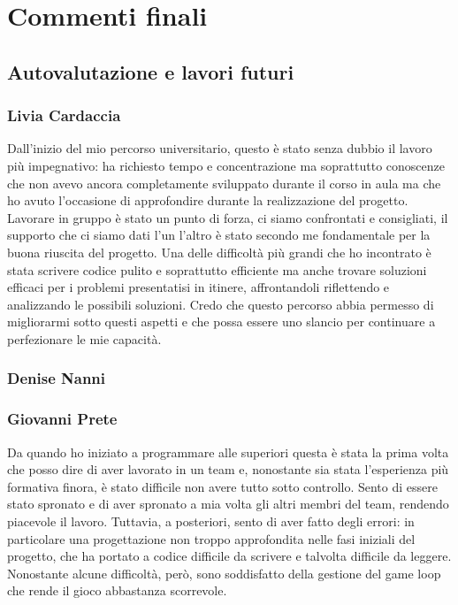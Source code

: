 \documentclass{article}
\begin{document}
\section{Commenti finali}
\subsection{Autovalutazione e lavori futuri}
\subsubsection{Livia Cardaccia}
Dall'inizio del mio percorso universitario, questo è stato senza dubbio il lavoro più impegnativo: ha richiesto tempo e concentrazione ma soprattutto conoscenze che non avevo ancora completamente sviluppato durante il corso in aula ma che ho avuto l'occasione di approfondire durante la realizzazione del progetto. Lavorare in gruppo è stato un punto di forza, ci siamo confrontati e consigliati, il supporto che ci siamo dati l'un l'altro è stato secondo me fondamentale per la buona riuscita del progetto. Una delle difficoltà più grandi che ho incontrato è stata scrivere codice pulito e soprattutto efficiente ma anche trovare soluzioni efficaci per i problemi presentatisi in itinere, affrontandoli riflettendo e analizzando le possibili soluzioni. Credo che questo percorso abbia permesso di migliorarmi sotto questi aspetti e che possa essere uno slancio per continuare a perfezionare le mie capacità. 
\subsubsection{Denise Nanni}
\subsubsection{Giovanni Prete}
Da quando ho iniziato a programmare alle superiori questa è stata la prima volta che posso dire di aver lavorato in un team e, nonostante sia stata l'esperienza più formativa finora, è stato difficile non avere tutto sotto controllo. Sento di essere stato spronato e di aver spronato a mia volta gli altri membri del team, rendendo piacevole il lavoro. Tuttavia, a posteriori, sento di aver fatto degli errori: in particolare una progettazione non troppo approfondita nelle fasi iniziali del progetto, che ha portato a codice difficile da scrivere e talvolta difficile da leggere. Nonostante alcune difficoltà, però, sono soddisfatto della gestione del game loop che rende il gioco abbastanza scorrevole.\\
\end{document}

